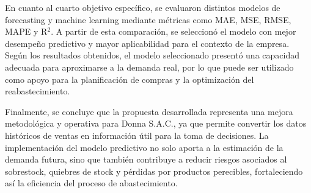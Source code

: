En cuanto al cuarto objetivo específico, se evaluaron distintos modelos de forecasting y machine learning mediante métricas como MAE, MSE, RMSE, MAPE y R$^2$. A partir de esta comparación, se seleccionó el modelo con mejor desempeño predictivo y mayor aplicabilidad para el contexto de la empresa. Según los resultados obtenidos, el modelo seleccionado presentó una capacidad adecuada para aproximarse a la demanda real, por lo que puede ser utilizado como apoyo para la planificación de compras y la optimización del reabastecimiento.

Finalmente, se concluye que la propuesta desarrollada representa una mejora metodológica y operativa para Donna S.A.C., ya que permite convertir los datos históricos de ventas en información útil para la toma de decisiones. La implementación del modelo predictivo no solo aporta a la estimación de la demanda futura, sino que también contribuye a reducir riesgos asociados al sobrestock, quiebres de stock y pérdidas por productos perecibles, fortaleciendo así la eficiencia del proceso de abastecimiento.








